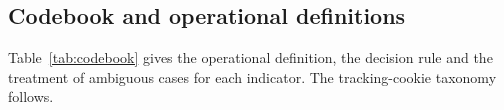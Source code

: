 \documentclass[pdflatex,sn-basic,Numbered,iicol]{sn-jnl}
\theoremstyle{thmstyleone}
\theoremstyle{thmstyletwo}
\theoremstyle{thmstylethree}
\begin{document}
	\clearpage
	\onecolumn
	\begin{appendices}
		
		\renewcommand{\thetable}{\thesection\arabic{table}}
		\renewcommand{\thefigure}{\thesection\arabic{figure}}
		
		\section{Codebook and operational definitions}\label{ap:codebook}
		\setcounter{table}{0}\setcounter{figure}{0}
		
		Table~\ref{tab:codebook} gives the operational definition, the decision rule and the treatment of ambiguous cases for each indicator. The tracking-cookie taxonomy follows.
		

\end{appendices}
\end{document}
